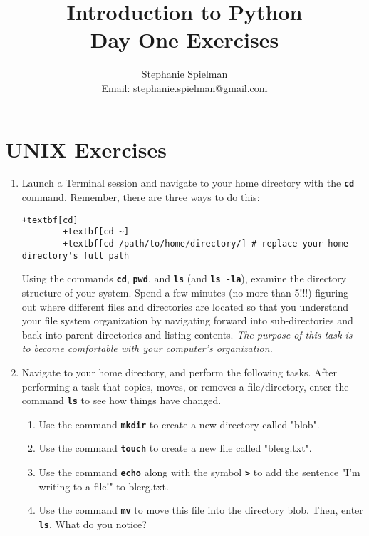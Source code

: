 \documentclass{article}[12pt]
\newcommand{\code}[1]{\textbf{\texttt{#1}}}
\begin{document}
\title{Introduction to Python \\ Day One Exercises}
\author{Stephanie Spielman \\ \footnotesize{Email: stephanie.spielman@gmail.com}}
\date{}
\maketitle{}

\section{UNIX Exercises}

\begin{enumerate}[itemsep=5ex]
	\item Launch a Terminal session and navigate to your home directory with the \code{cd} command. Remember, there are three ways to do this:
		\begin{Verbatim}[fontsize=\small,xleftmargin=-2.5cm,commandchars=+\[\]]
		+textbf[cd]
		+textbf[cd ~]
		+textbf[cd /path/to/home/directory/] # replace your home directory's full path
		\end{Verbatim}
		Using the commands \code{cd}, \code{pwd}, and \code{ls} (and \code{ls -la}), examine the directory structure of your system. Spend a few minutes (no more than 5!!!) figuring out where different files and directories are located so that you understand your file system organization by navigating forward into sub-directories and back into parent directories and listing contents. \emph{The purpose of this task is to become comfortable with your computer's organization.}
	
	\item Navigate to your home directory, and perform the following tasks. After performing a task that copies, moves, or removes a file/directory, enter the command \code{ls} to see how things have changed.
	\begin{enumerate}[itemsep=2ex]
		\item Use the command \code{mkdir} to create a new directory called "blob".
		
		\item Use the command \code{touch} to create a new file called "blerg.txt".
		
		\item Use the command \code{echo} along with the symbol \code{>} to add the sentence "I'm writing to a file!" to blerg.txt.
		
		\item Use the command \code{mv} to move this file into the directory blob. Then, enter \code{ls}. What do you notice?
		

\end{enumerate}
\end{enumerate}
\end{document}
